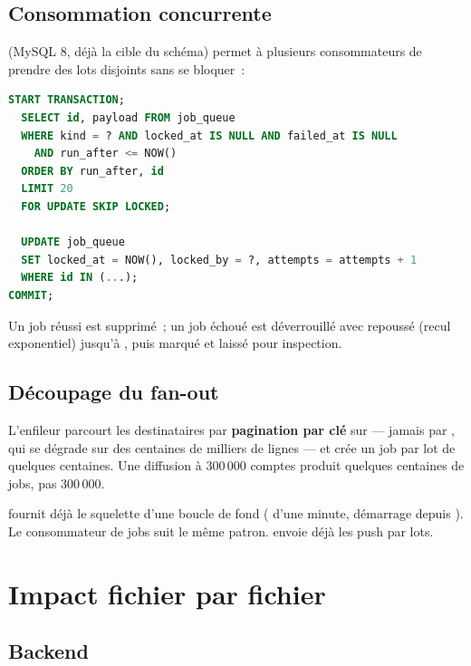 \section{Consommation concurrente}

 (MySQL 8, déjà la cible du schéma) permet à plusieurs consommateurs de
prendre des lots disjoints sans se bloquer~:

\begin{lstlisting}[language=SQL, numbers=none]
START TRANSACTION;
  SELECT id, payload FROM job_queue
  WHERE kind = ? AND locked_at IS NULL AND failed_at IS NULL
    AND run_after <= NOW()
  ORDER BY run_after, id
  LIMIT 20
  FOR UPDATE SKIP LOCKED;

  UPDATE job_queue
  SET locked_at = NOW(), locked_by = ?, attempts = attempts + 1
  WHERE id IN (...);
COMMIT;
\end{lstlisting}

Un job réussi est supprimé~; un job échoué est déverrouillé avec  repoussé
(recul exponentiel) jusqu'à , puis marqué  et laissé
pour inspection.

\section{Découpage du fan-out}

L'enfileur parcourt les destinataires par \textbf{pagination par clé} sur 
--- jamais par , qui se dégrade sur des centaines de milliers de lignes --- et
crée un job par lot de quelques centaines. Une diffusion à 300\,000 comptes produit quelques
centaines de jobs, pas 300\,000.

\begin{note}
 fournit déjà le squelette d'une boucle de fond
( d'une minute, démarrage depuis ). Le consommateur de
jobs suit le même patron.  envoie déjà les push par lots.
\end{note}

\chapter{Impact fichier par fichier}

\section{Backend}

